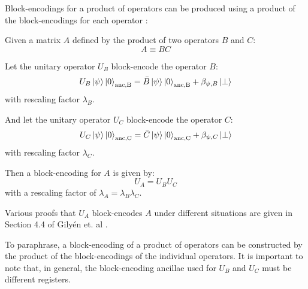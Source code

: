 Block-encodings for a product of operators can be produced using a product of the block-encodings for each operator \cite{gilyen2019quantum}:
\begin{theorem}
    \label{th:product}
    Given a matrix $A$ defined by the product of two operators $B$ and $C$:
    \begin{equation}
        \label{eq:product}
        A \equiv BC
    \end{equation}
    
    Let the unitary operator $U_B$ block-encode the operator $B$:
    \begin{equation}
        U_B \ket{\psi}\ket{0}_\text{anc,B} = \bar{B} \ket{\psi} \ket{0}_\text{anc,B} + \beta_{\psi, B} \ket{\perp}
    \end{equation}
    with rescaling factor $\lambda_B$.
    
    And let the unitary operator $U_C$ block-encode the operator $C$:
    \begin{equation}
        U_C \ket{\psi}\ket{0}_\text{anc,C} = \bar{C} \ket{\psi} \ket{0}_\text{anc,C} + \beta_{\psi, C} \ket{\perp}
    \end{equation}
    with rescaling factor $\lambda_C$.

    Then a block-encoding for $A$ is given by:
    \begin{equation}
        \label{eq:product-be}
        U_A = U_B U_C
    \end{equation}
    with a rescaling factor of $\lambda_A = \lambda_B \lambda_C$.
\end{theorem}
Various proofs that $U_A$ block-encodes $A$ under different situations are given in Section 4.4 of Gilyén et. al \cite{gilyen2019quantum}.

To paraphrase, a block-encoding of a product of operators can be constructed by the product of the block-encodings of the individual operators.
It is important to note that, in general, the block-encoding ancillae used for $U_B$ and $U_C$ must be different registers.
